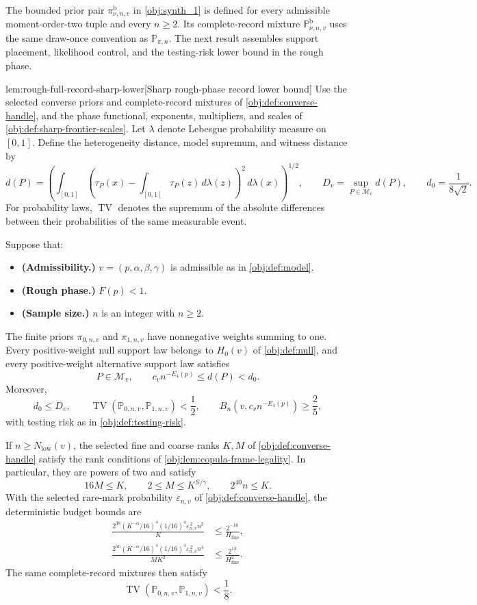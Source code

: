 \documentclass[11pt]{article}
\begin{document}
The bounded prior pair \(\pi^{\mathrm b}_{\nu,n,v}\) in \cref{obj:synth_1} is defined for every admissible moment-order-two tuple and every \(n\ge2\). Its complete-record mixture \(\mathbb P^{\mathrm b}_{\nu,n,v}\) uses the same draw-once convention as \(\mathbb P_{\pi,n}\). The next result assembles support placement, likelihood control, and the testing-risk lower bound in the rough phase.

\begin{lemmav}{lem:rough-full-record-sharp-lower}[Sharp rough-phase record lower bound]
Use the selected converse priors and complete-record mixtures of \cref{obj:def:converse-handle}, and the phase functional, exponents, multipliers, and scales of \cref{obj:def:sharp-frontier-scales}. Let \(\lambda\) denote Lebesgue probability measure on \([0,1]\). Define the heterogeneity distance, model supremum, and witness distance by
\[
d(P)=\left(\int_{[0,1]}
\left(\tau_P(x)-\int_{[0,1]}\tau_P(z)\,d\lambda(z)\right)^2
\,d\lambda(x)\right)^{1/2},
\qquad
D_v=\sup_{P\in\mathcal M_v}d(P),
\qquad
d_0=\frac{1}{8\sqrt2}.
\]
For probability laws, \(\operatorname{TV}\) denotes the supremum of the absolute differences between their probabilities of the same measurable event.

Suppose that:
\begin{itemize}
\item \textbf{(Admissibility.)} \(v=(p,\alpha,\beta,\gamma)\) is admissible as in \cref{obj:def:model}.
\item \textbf{(Rough phase.)} \(F(p)<1\).
\item \textbf{(Sample size.)} \(n\) is an integer with \(n\ge2\).
\end{itemize}
The finite priors \(\pi_{0,n,v}\) and \(\pi_{1,n,v}\) have nonnegative weights summing to one. Every positive-weight null support law belongs to \(H_0(v)\) of \cref{obj:def:null}, and every positive-weight alternative support law satisfies
\[
P\in\mathcal M_v,
\qquad
c_vn^{-E_4(p)}\le d(P)<d_0.
\]
Moreover,
\[
d_0\le D_v,
\qquad
\operatorname{TV}(\mathbb P_{0,n,v},\mathbb P_{1,n,v})<\frac12,
\qquad
B_n\!\left(v,c_vn^{-E_4(p)}\right)\ge\frac25,
\]
with testing risk as in \cref{obj:def:testing-risk}.

If \(n\ge N_{\mathrm{low}}(v)\), the selected fine and coarse ranks \(K,M\) of \cref{obj:def:converse-handle} satisfy the rank conditions of \cref{obj:lem:copula-frame-legality}. In particular, they are powers of two and satisfy
\[
16M\le K,
\qquad
2\le M\le K^{S/\gamma},
\qquad
2^{40}n\le K.
\]
With the selected rare-mark probability \(\varepsilon_{n,v}\) of \cref{obj:def:converse-handle}, the deterministic budget bounds are
\[
\begin{aligned}
\frac{2^{38}(K^{-\alpha}/16)^4(1/16)^4
      \varepsilon_{n,v}^{\,2}n^2}{K}
&\le \frac{2^{-10}}{H_{\mathrm{fine}}},\\
\frac{2^{56}(K^{-\alpha}/16)^4(1/16)^4
      \varepsilon_{n,v}^{\,2}n^4}{MK^2}
&\le \frac{2^{13}}{H_{\mathrm{fine}}^2}.
\end{aligned}
\]
The same complete-record mixtures then satisfy
\[
\operatorname{TV}(\mathbb P_{0,n,v},\mathbb P_{1,n,v})<\frac18.
\]


\end{lemmav}
\end{document}
